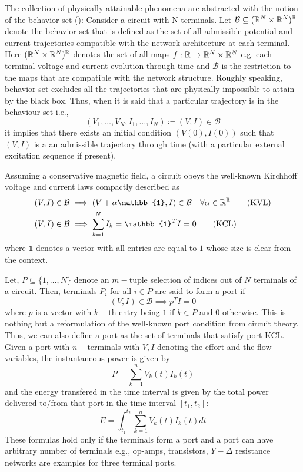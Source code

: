 The collection of physically attainable phenomena are abstracted with the notion of the behavior set (\cite{behavbook}):
Consider a circuit with N terminals. Let $\mathcal{B}\subseteq (\mathbb{R}^N\times\mathbb{R}^N)^{\mathbb{R}}$ denote the behavior set 
that is defined as the set of all admissible potential and current trajectories compatible with the network architecture 
at each terminal. Here $(\mathbb{R}^N\times\mathbb{R}^N)^{\mathbb{R}}$ denotes 
the set of all maps $f: \mathbb{R}\to\mathbb{R}^N\times\mathbb{R}^N$ e.g. each terminal voltage and current evolution through time 
and $\mathcal{B}$ is the restriction to the maps that are compatible with the network structure. Roughly speaking, behavior
set excludes all the trajectories that are physically impossible to attain by the black box. Thus, when it is said that
a particular trajectory is in the behaviour set i.e., 
\[
(V_1,\ldots,V_N,I_1,\ldots,I_N)\coloneqq (V,I) \in\mathcal{B}
\]
it implies that there exists an initial condition $(V(0),I(0))$ such that $(V,I)$ is a an admissible trajectory through time
(with a particular external excitation sequence if present).


Assuming a conservative magnetic field, a circuit obeys the well-known Kirchhoff voltage and current laws compactly described 
as 
\begin{align}
(V,I)\in\mathcal{B} &\implies (V+\alpha\mathbb{1},I)\in\mathcal{B} \quad \forall \alpha\in\Real^\Real \tag{KVL}\\
(V,I)\in\mathcal{B} &\implies \sum_{k=1}^N{I_k}=\mathbb{1}^TI=0 \tag{KCL}
\end{align}
where $\mathbb{1}$ denotes a vector with all entries are equal to $1$ whose size is clear from the context.

Let, $P \subseteq \{1,\ldots,N\}$ denote an $m-$tuple selection of indices out of $N$ terminals of a circuit. Then, terminals
$P_i$ for all $i\in P$ are said to form a port if 
\[
(V,I)\in\mathcal{B} \implies p^TI=0 \tag{Port KCL}
\]
where $p$ is a vector with $k-$th entry being $1$ if $k\in P$ and $0$ otherwise. This is nothing but a reformulation of the well-known 
port condition from circuit theory. Thus, we can also define a port as the set of terminals that satisfy port KCL. Given a port with 
$n-$terminals with $V,I$ denoting the effort and the flow variables, the 
instantaneous power is given by 
\[
P = \sum_{k=1}^n{V_k(t)I_k(t)}
\]
and the energy transfered in the time interval is given by the total power delivered
to/from that port in the time interval $[t_1,t_2]$: 
\[
E = \int^{t_{2}}_{t_{1}}\sum_{k=1}^n{V_k(t)I_k(t)}dt
\]
These formulas hold only if the terminals form a port and a port can have arbitrary number of terminals 
e.g., op-amps, transistors, $Y-\Delta$ resistance networks are examples for three terminal ports. 


